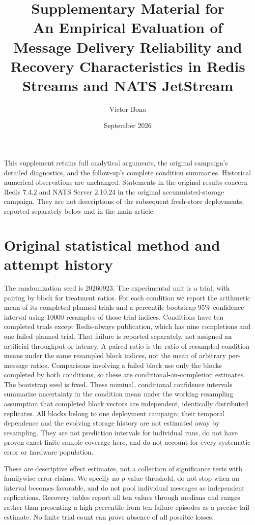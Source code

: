 \documentclass[11pt]{article}
\title{Supplementary Material for\\An Empirical Evaluation of Message Delivery Reliability and Recovery Characteristics in Redis Streams and NATS JetStream}
\author{Victor Bona}
\date{September 2026}
\theoremstyle{definition}
\begin{document}
\maketitle
\noindent This supplement retains full analytical arguments, the original campaign's detailed diagnostics, and the follow-up's complete condition summaries. Historical numerical observations are unchanged. Statements in the original results concern Redis 7.4.2 and NATS Server 2.10.24 in the original accumulated-storage campaign. They are not descriptions of the subsequent fresh-store deployments, reported separately below and in the main article.


\section{Original statistical method and attempt history}\label{sec:method}
The randomization seed is 20260923. The experimental unit is a trial, with pairing by block for treatment ratios. For each condition we report the arithmetic mean of its completed planned trials and a percentile bootstrap 95\% confidence interval using 10000 resamples of those trial indices. Conditions have ten completed trials except Redis-always publication, which has nine completions and one failed planned trial. That failure is reported separately, not assigned an artificial throughput or latency. A paired ratio is the ratio of resampled condition means under the same resampled block indices, not the mean of arbitrary per-message ratios. Comparisons involving a failed block use only the blocks completed by both conditions, so these are conditional-on-completion estimates. The bootstrap seed is fixed. These nominal, conditional confidence intervals summarize uncertainty in the condition mean under the working resampling assumption that completed block vectors are independent, identically distributed replicates. All blocks belong to one deployment campaign; their temporal dependence and the evolving storage history are not estimated away by resampling. They are not prediction intervals for individual runs, do not have proven exact finite-sample coverage here, and do not account for every systematic error or hardware population.

These are descriptive effect estimates, not a collection of significance tests with familywise error claims. We specify no $p$-value threshold, do not stop when an interval becomes favorable, and do not pool individual messages as independent replications. Recovery tables report all ten values through medians and ranges rather than presenting a high percentile from ten failure episodes as a precise tail estimate. No finite trial count can prove absence of all possible losses.
\end{document}
